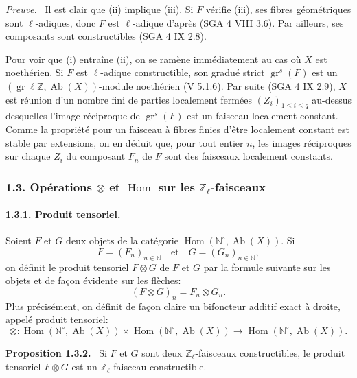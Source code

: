 \documentclass[11pt]{article}
\newenvironment{statement}[1]{\par\medskip\noindent\textbf{#1.}\ }{\par\medskip}
\newenvironment{prooftext}[1][Proof]{\par\noindent\emph{#1.}\ }{\par\medskip}
\DeclareMathOperator{\Hom}{Hom}
\providecommand{\Hom}{\operatorname{Hom}}
\providecommand{\Ab}{\operatorname{Ab}}
\providecommand{\Ab}{\operatorname{Ab}}
\begin{document}
\begin{prooftext}[Preuve]
Il est clair que (ii) implique (iii). Si \(F\) vérifie (iii), ses fibres géométriques sont \(\ell\)-adiques, donc \(F\) est \(\ell\)-adique d'après (SGA 4 VIII 3.6). Par ailleurs, ses composants sont constructibles (SGA 4 IX 2.8).

Pour voir que (i) entraîne (ii), on se ramène immédiatement au cas où \(X\) est noethérien. Si \(F\) est \(\ell\)-adique constructible, son gradué strict \(\operatorname{gr}^s(F)\) est un \((\operatorname{gr}\ell\mathbb Z,\Ab(X))\)-module noethérien (V 5.1.6). Par suite (SGA 4 IX 2.9), \(X\) est réunion d'un nombre fini de parties localement fermées \((Z_i)_{1\le i\le q}\) au-dessus desquelles l'image réciproque de \(\operatorname{gr}^s(F)\) est un faisceau localement constant. Comme la propriété pour un faisceau à fibres finies d'être localement constant est stable par extensions, on en déduit que, pour tout entier \(n\), les images réciproques sur chaque \(Z_i\) du composant \(F_n\) de \(F\) sont des faisceaux localement constants.
\end{prooftext}

\subsubsection*{1.3. Opérations \(\otimes\) et \(\Hom\) sur les \(\mathbb Z_\ell\)-faisceaux}

\paragraph{1.3.1. Produit tensoriel.}
Soient \(F\) et \(G\) deux objets de la catégorie \(\Hom(\mathbb N^\circ,\Ab(X))\). Si
\[
F=(F_n)_{n\in\mathbb N}\quad\text{et}\quad G=(G_n)_{n\in\mathbb N},
\]
on définit le produit tensoriel \(F\otimes G\) de \(F\) et \(G\) par la formule suivante sur les objets et de façon évidente sur les flèches:
\[
(F\otimes G)_n=F_n\otimes G_n.
\]
Plus précisément, on définit de façon claire un bifoncteur additif exact à droite, appelé produit tensoriel:
\[
\otimes:\Hom(\mathbb N^\circ,\Ab(X))\times \Hom(\mathbb N^\circ,\Ab(X))
\longrightarrow \Hom(\mathbb N^\circ,\Ab(X)).
\]

\begin{statement}{Proposition 1.3.2}
Si \(F\) et \(G\) sont deux \(\mathbb Z_\ell\)-faisceaux constructibles, le produit tensoriel \(F\otimes G\) est un \(\mathbb Z_\ell\)-faisceau constructible.
\end{statement}
\end{document}
